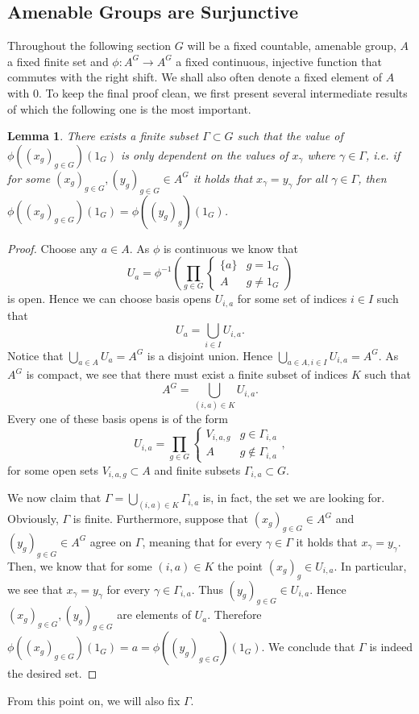 \documentclass[titlepage, a4paper]{article}
\theoremstyle{theoremdd}
\newtheorem{lemma}[theorem]{Lemma}
\theoremstyle{definitiondd}
\theoremstyle{remarkdd}
\begin{document}
\subsection{Amenable Groups are Surjunctive} \label{ssec:amenable_surjunctive}
Throughout the following section $G$ will be a fixed countable, amenable group, $A$ a fixed finite set and $\phi: A^{G} \to A^{G}$ a fixed continuous, injective function that commutes with the right shift. 
We shall also often denote a fixed element of $A$ with $0$.
To keep the final proof clean, we first present several intermediate results of which the following one is the most important.
\begin{lemma}
	There exists a finite subset $\Gamma \subset G$ such that the value of $\phi((x_g)_{g \in G})(1_G)$ is only dependent on the values of $x_\gamma$ where  $\gamma \in \Gamma$, 
	i.e. if for some  $(x_g)_{g \in G}, (y_g)_{g \in G} \in A^{G}$ it holds that $x_\gamma = y_\gamma$ for all $\gamma \in \Gamma$, then $\phi((x_g)_{g \in G})(1_G) = \phi((y_g)_g)(1_G)$.
\end{lemma}
\begin{proof}
	Choose any $a \in A$. As $\phi$ is continuous we know that \[
	U_a = \phi^{-1}\left( \prod_{g\in G} \begin{cases}
			\{a\} & g = 1_G\\
			A & g \ne 1_G
	\end{cases} \right)
\]
	is open. Hence we can choose basis opens $U_{i, a}$ for some set of indices $i \in I$ such that  \[
		U_a= \bigcup_{i \in I} U_{i,a}
	.\] 
	Notice that $\bigcup_{a \in A} U_a = A^{G}$ is a disjoint union. 
	Hence $\bigcup_{a \in A, i \in I} U_{i, a} = A^{G}$. 
	As $A^{G}$ is compact, we see that there must exist a finite subset of indices $K$ such that \[
		A^{G} = \bigcup_{(i, a) \in K} U_{i, a}
	.\] 
	Every one of these basis opens is of the form \[
	U_{i,a} = \prod_{g \in G} \begin{cases}
		V_{i,a,g} & g \in \Gamma_{i,a}\\
		A & g \not\in \Gamma_{i,a}
	\end{cases}
	,\]
	for some open sets $V_{i,a,g} \subset A$ and finite subsets $\Gamma_{i,a} \subset G$. 

	We now claim that $\Gamma = \bigcup_{(i,a) \in K} \Gamma_{i,a}$ is, in fact, the set we are looking for. 
	Obviously, $\Gamma$ is finite. 
	Furthermore, suppose that $(x_g)_{g\in G} \in A^{G}$ and $(y_g)_{g \in G} \in A^{G}$ agree on $\Gamma$,
	meaning that for every $\gamma \in \Gamma$ it holds that  $x_\gamma = y_\gamma$.
	Then, we know that for some  $(i, a) \in K$ the point $(x_g)_g \in U_{i,a}$. 
	In particular, we see that $x_\gamma = y_\gamma$ for every $\gamma \in \Gamma_{i,a}$. 
	Thus $(y_g)_{g \in G} \in U_{i, a}$. 
	Hence  $(x_g)_{g \in G} , (y_g)_{g \in G}$ are elements of $U_a$. 
	Therefore  $\phi((x_g)_{g \in G})(1_G) = a = \phi((y_g)_{g \in G})(1_G) $.
	We conclude that $\Gamma$ is indeed the desired set.
\end{proof}
From this point on, we will also fix $\Gamma$. 
\end{document}
